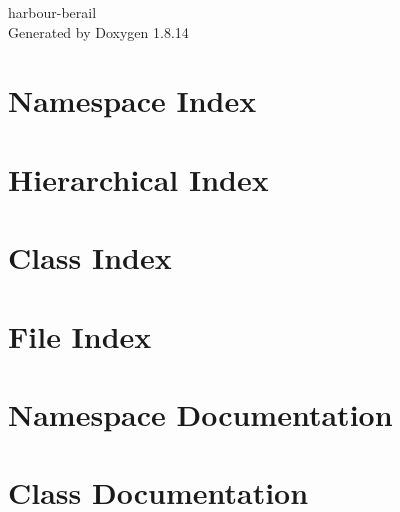 \documentclass[twoside]{book}
\newcommand{\+}{\discretionary{\mbox{\scriptsize$\hookleftarrow$}}{}{}}
\newcommand{\clearemptydoublepage}{%
  \newpage{\pagestyle{empty}\cleardoublepage}%
}
\begin{document}
\hypersetup{pageanchor=false,
             bookmarksnumbered=true,
             pdfencoding=unicode
            }
\begin{titlepage}
\vspace*{7cm}
\begin{center}%
{\Large harbour-\/berail }\\
\vspace*{1cm}
{\large Generated by Doxygen 1.8.14}\\
\end{center}
\end{titlepage}
\clearemptydoublepage
{}
\tableofcontents
\clearemptydoublepage
{}
\hypersetup{pageanchor=true}

\chapter{Namespace Index}

\chapter{Hierarchical Index}

\chapter{Class Index}

\chapter{File Index}

\chapter{Namespace Documentation}




\chapter{Class Documentation}



















\end{document}
